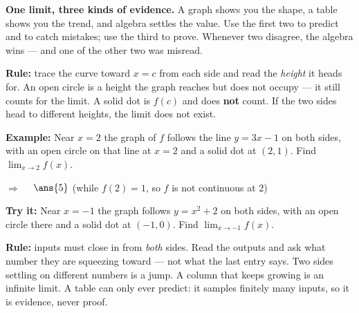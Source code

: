 \documentclass[12pt]{article}
\begin{document}

\begin{formulabox}
\textbf{One limit, three kinds of evidence.} A graph shows you the shape, a
table shows you the trend, and algebra settles the value. Use the first two to
predict and to catch mistakes; use the third to prove. Whenever two disagree,
the algebra wins --- and one of the other two was misread.
\end{formulabox}


\begin{formulabox}
\textbf{Rule:} trace the curve toward $x = c$ from each side and read the
\emph{height} it heads for. An open circle is a height the graph reaches but does
not occupy --- it still counts for the limit. A solid dot is $f(c)$ and does
\textbf{not} count. If the two sides head to different heights, the limit does
not exist.
\end{formulabox}

\begin{examplebox}
\textbf{Example:} \quad Near $x = 2$ the graph of $f$ follows the line
$y = 3x - 1$ on both sides, with an open circle on that line at $x = 2$ and a
solid dot at $(2, 1)$. Find $\displaystyle\lim_{x \to 2} f(x)$.

$\Rightarrow\quad$ $\ans{5}$ \quad (while $f(2) = 1$, so $f$ is not continuous at $2$)
\end{examplebox}

\begin{tryitbox}
\textbf{Try it:} \quad Near $x = -1$ the graph follows $y = x^2 + 2$ on both
sides, with an open circle there and a solid dot at $(-1, 0)$. Find
$\displaystyle\lim_{x \to -1} f(x)$.\\[2pt]
\end{tryitbox}


\begin{formulabox}
\textbf{Rule:} inputs must close in from \emph{both} sides. Read the outputs and
ask what number they are squeezing toward --- not what the last entry says. Two
sides settling on different numbers is a jump. A column that keeps growing is an
infinite limit. A table can only ever predict: it samples finitely many inputs,
so it is evidence, never proof.
\end{formulabox}
\end{document}
